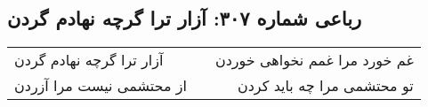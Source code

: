 \begin{center}
\section*{رباعی شماره ۳۰۷: آزار ترا گرچه نهادم گردن}
\label{sec:sh307}
\begin{longtable}{l p{0.5cm} r}
آزار ترا گرچه نهادم گردن
&&
غم خورد مرا غمم نخواهی خوردن
\\
از محتشمی نیست مرا آزردن
&&
تو محتشمی مرا چه باید کردن
\\
\end{longtable}
\end{center}

